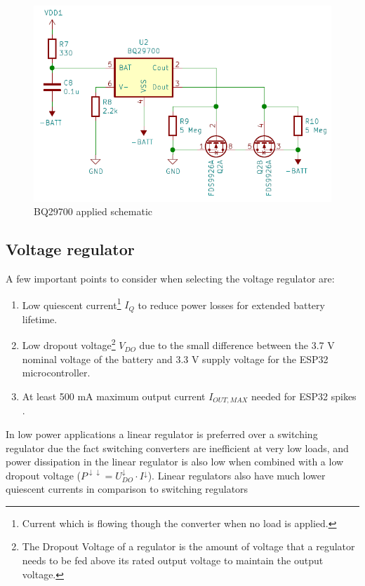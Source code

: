\documentclass[11pt,a4paper]{article}
\begin{document}
\begin{figure}[H]
	\centering
	\includegraphics[width=0.9\linewidth]{bq29700_toegepast.png}
	\caption{BQ29700 applied schematic}  %
	\label{fig:bq29700_toegepast}
\end{figure}


\subsection{Voltage regulator}
A few important points to consider when selecting the voltage regulator are:
\begin{enumerate}
	\item Low quiescent current\footnote{Current which is flowing though the converter when no load is applied.} $I_Q$ to reduce power losses for extended battery lifetime.
	\item Low dropout voltage\footnote{The Dropout Voltage of a regulator is the amount of voltage that a regulator needs to be fed above its rated output voltage to maintain the output voltage.} $V_{DO}$ due to the small difference between the 3.7 V nominal voltage of the battery and 3.3 V supply voltage for the ESP32 microcontroller.
	\item At least 500 mA maximum output current $I_{OUT,MAX}$ needed for ESP32 spikes \cite{bib:ESP32-SOLO-1}.
\end{enumerate}
In low power applications a linear regulator is preferred over a switching regulator due the fact switching converters are inefficient at very low loads, and power dissipation in the linear regulator is also low when combined with a low dropout voltage ($P^{\downarrow\downarrow} = U_{DO}^\downarrow\cdot I^\downarrow$). Linear regulators also have much lower quiescent currents in comparison to switching regulators \cite{LDOvsSwitch:1, LDOvsSwitch:2}
\end{document}
